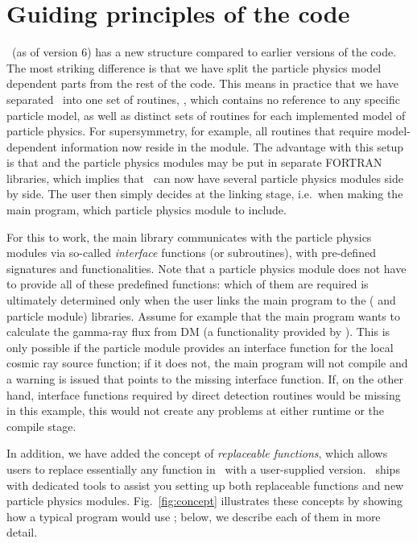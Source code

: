 \chapter{Guiding principles of the code}
\label{ch:philosophy}

\ds\ (as of version 6) has a new structure compared to earlier versions of the code. The most 
striking difference is that we have split the particle physics model dependent parts from 
the rest of the code. This means in practice that we have separated \ds\ into one set of 
routines, , which contains no reference to any specific particle model, as 
well as distinct sets of routines for each implemented model of particle physics. For 
supersymmetry, 
 for example, all routines that require model-dependent information now reside in the 
  module. The advantage with this setup is that  and the 
 particle physics modules may be put in separate FORTRAN libraries, which implies
 that \ds\ can now have several particle physics modules side by side. The user 
 then simply decides at the linking stage, i.e.~when making the main program, which 
 particle physics module to include. 
 
 For this to work, the main library communicates with the particle physics modules via
 so-called \emph{interface} functions (or subroutines), with 
 pre-defined signatures and functionalities.  Note that a 
 particle physics module does not have to provide all of these predefined functions: 
 which of them are required is ultimately determined only when the user links the main
 program to the ( and particle module) libraries. Assume for example that 
 the main program wants to calculate 
 the gamma-ray flux from DM (a functionality provided by ). This is only
 possible if the particle module provides an interface function for the local cosmic ray
 source function; if it does not, the main program will not compile and a  
 warning is issued that points to the missing interface function. If, on the other hand,
 interface functions required by direct detection routines would be missing in this example,
 this would not create any problems at either runtime or the compile stage.


 In addition, we have added the concept of 
 \emph{replaceable functions}, which allows users to replace essentially any function in 
 \ds\ with a user-supplied version. \ds\ ships with dedicated tools to assist you setting up 
 both replaceable functions and new particle physics modules.
 Fig.~\ref{fig:concept} illustrates these concepts by showing how a typical program 
 would use \ds; below, we describe each of them in more detail. 

